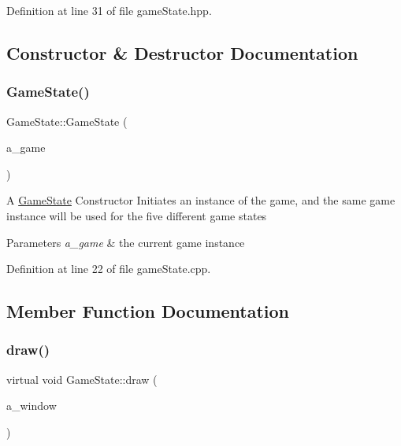 Definition at line 31 of file game\+State.\+hpp.



\subsection{Constructor \& Destructor Documentation}
\mbox{\label{class_game_state_a294ebc243ce5cf5f845b8548aba8e723}} 
\subsubsection{\texorpdfstring{Game\+State()}{GameState()}}
{\footnotesize\ttfamily Game\+State\+::\+Game\+State (\begin{DoxyParamCaption}\item[{\hyperlink{class_game}{Game} $\ast$}]{a\+\_\+game }\end{DoxyParamCaption})}

A \hyperlink{class_game_state}{Game\+State} Constructor Initiates an instance of the game, and the same game instance will be used for the five different game states 
\begin{DoxyParams}{Parameters}
{\em a\+\_\+game} & the current game instance \\
\hline
\end{DoxyParams}


Definition at line 22 of file game\+State.\+cpp.



\subsection{Member Function Documentation}
\mbox{\label{class_game_state_a5ffd5ce9acb7499ddef613e8836d1ef8}} 
\subsubsection{\texorpdfstring{draw()}{draw()}}
{\footnotesize\ttfamily virtual void Game\+State\+::draw (\begin{DoxyParamCaption}\item[{sf\+::\+Render\+Window \&}]{a\+\_\+window }\end{DoxyParamCaption})\hspace{0.3cm}{\ttfamily [pure virtual]}}

